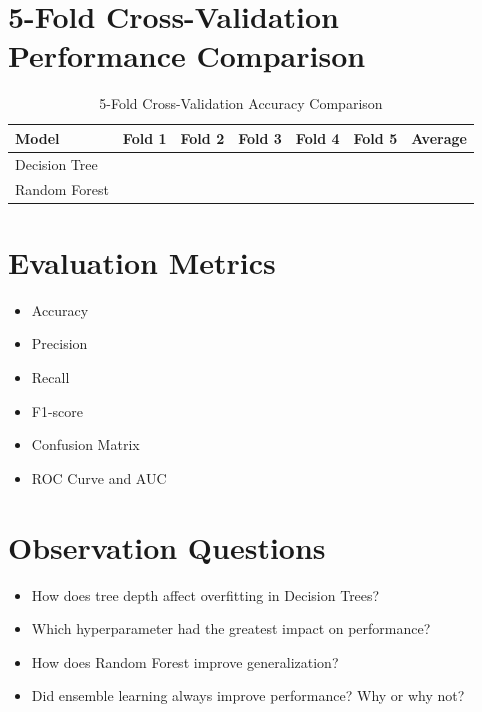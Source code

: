 \documentclass[11pt]{article}
\begin{document}

\section*{5-Fold Cross-Validation Performance Comparison}

\begin{table}[h!]
\centering
\caption{5-Fold Cross-Validation Accuracy Comparison}
\begin{tabular}{lcccccc}
\toprule
Model & Fold 1 & Fold 2 & Fold 3 & Fold 4 & Fold 5 & Average \\
\midrule
Decision Tree &  &  &  &  &  &  \\
Random Forest &  &  &  &  &  &  \\
\bottomrule
\end{tabular}
\end{table}


\section*{Evaluation Metrics}
\begin{itemize}
    \item Accuracy
    \item Precision
    \item Recall
    \item F1-score
    \item Confusion Matrix
    \item ROC Curve and AUC
\end{itemize}


\section*{Observation Questions}
\begin{itemize}
    \item How does tree depth affect overfitting in Decision Trees?
    \item Which hyperparameter had the greatest impact on performance?
    \item How does Random Forest improve generalization?
    \item Did ensemble learning always improve performance? Why or why not?
\end{itemize}
\end{document}
